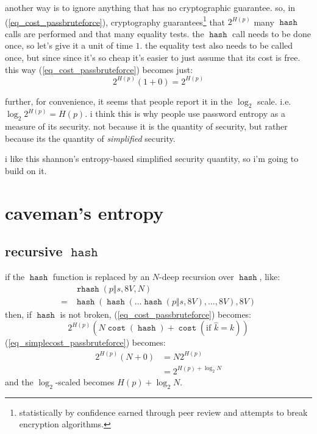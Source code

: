 \documentclass[twocolumn]{article}
\DeclareMathOperator{\hash}{\mathtt{hash}}
\DeclareMathOperator{\rhash}{\mathtt{rhash}}
\DeclareMathOperator{\cost}{\mathtt{cost}}
\begin{document}
another way is to ignore anything that has no cryptographic guarantee.  so,
in (\ref{eq_cost_passbruteforce}), cryptography
guarantees\footnote{statistically by confidence earned through peer review
and attempts to break encryption algorithms.} that $2^{H(p)}$ many $\hash$
calls are performed and that many equality tests.  the $\hash$ call needs
to be done once, so let's give it a unit of time $1$.  the equality test
also needs to be called once, but since since it's so cheap it's easier to
just assume that its cost is free.  this way (\ref{eq_cost_passbruteforce})
becomes just:
\begin{equation}\label{eq_simplecost_passbruteforce}
    2^{H(p)} (1+0) = 2^{H(p)}
\end{equation}

further, for convenience, it seems that people report it in the $\log_2$
scale.  i.e. $\log_2 2^{H(p)} = H(p)$.  i think this is why people use
password entropy as a measure of its security.  not because it is the
quantity of security, but rather because its the quantity of
\emph{simplified} security.  

i like this shannon's entropy-based simplified security quantity, so i'm
going to build on it.

\section{caveman's entropy}
\subsection{recursive $\hash$}
if the $\hash$ function is replaced by an $N$-deep recursion over $\hash$,
like:
\[
    \begin{split}
        & \rhash(p \Vert s, 8V, N) \\
    ={} &  \hash(\hash(\ldots\hash(p \Vert s, 8V), \ldots, 8V), 8V)
    \end{split}
\]
then, if $\hash$ is not broken,  (\ref{eq_cost_passbruteforce}) becomes:
\begin{equation}\label{eq_cost_passbruteforce_N}
    2^{H(p)} \left(
        N\cost(\hash) + \cost(\text{if } \hat k = k)
    \right)
\end{equation}
(\ref{eq_simplecost_passbruteforce}) becomes:
\begin{equation}\label{eq_simplecost_passbruteforce_N}
    \begin{split}
    2^{H(p)} (N+0) &= N2^{H(p)} \\
                  &= 2^{H(p) + \log_2 N}
    \end{split}
\end{equation}
and the $\log_2$-scaled becomes $H(p) + \log_2 N$.
\end{document}
